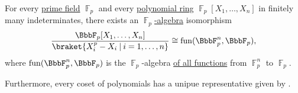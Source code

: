 \begin{proposition}\label{thm:functions_over_finite_fields}
  For every \hyperref[thm:finite_fields]{prime field} \( \BbbF_p \) and every \hyperref[def:polynomial_semiring]{polynomial ring} \( \BbbF_p[X_1, \ldots, X_n] \) in finitely many indeterminates, there exists an \hyperref[def:algebra_over_ring]{\( \BbbF_p \)-algebra} isomorphism
  \begin{equation*}
    \frac {\BbbF_p[X_1, \ldots, X_n]} {\braket{ X_i^p - X_i \given i = 1, \ldots, n }} \cong \fun(\BbbF_p^n, \BbbF_p),
  \end{equation*}
  where \( \fun(\BbbF_p^n, \BbbF_p) \) is the \( \BbbF_p \)-algebra \hyperref[thm:functions_over_semimodule]{of all functions} from \( \BbbF
  _p^n \) to \( \BbbF_p \).

  Furthermore, every coset of polynomials has a unipue representative given by .
\end{proposition}
